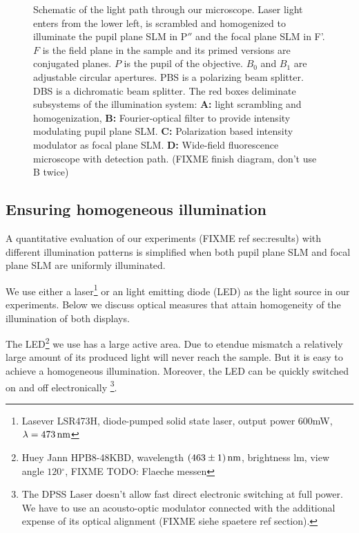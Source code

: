 \begin{figure}[!htbp]
  \centering
  \caption{Schematic of the light path through our microscope. Laser
    light enters from the lower left, is scrambled and homogenized to
    illuminate the pupil plane SLM in $\textrm{P}''$ and the focal
    plane SLM in F'. $F$ is the field plane in the sample and its
    primed versions are conjugated planes. $P$ is the pupil of the
    objective. $B_0$ and $B_1$ are adjustable circular apertures. PBS
    is a polarizing beam splitter. DBS is a dichromatic beam splitter.
    The red boxes deliminate subsystems of the illumination system:
    {\bf A:} light scrambling and homogenization, {\bf B:}
    Fourier-optical filter to provide intensity modulating pupil plane
    SLM. {\bf C:} Polarization based intensity modulator as focal
    plane SLM. {\bf D:} Wide-field fluorescence microscope with
    detection path. (FIXME finish diagram, don't use B twice)}
  \label{fig:memi-real}
\end{figure}

\subsection{Ensuring homogeneous illumination}
A quantitative evaluation of our experiments (FIXME ref sec:results)
with different illumination patterns is simplified when both pupil
plane SLM and focal plane SLM are uniformly illuminated.

We use either a laser\footnote{Lasever LSR473H, diode-pumped solid
  state laser, output power 600mW, $\lambda=\unit[473]{nm}$} or an
light emitting diode (LED)  as
the light source in our experiments. Below we discuss optical measures
that attain homogeneity of the illumination of both displays.

The LED\footnote{Huey Jann HPB8-48KBD, wavelength
  $\unit[(463\pm1)]{nm}$, brightness \unit[35]{lm}, view angle
  $120{}^\circ$, FIXME TODO: Flaeche messen} we use has a large active
area. Due to etendue mismatch a relatively large amount of its
produced light will never reach the sample. But it is easy to achieve
a homogeneous illumination. Moreover, the LED can be quickly switched
on and off electronically \footnote{The DPSS Laser doesn't allow fast
  direct electronic switching at full power. We have to use an
  acousto-optic modulator connected with the additional expense of its
  optical alignment (FIXME siehe spaetere ref section).}.

